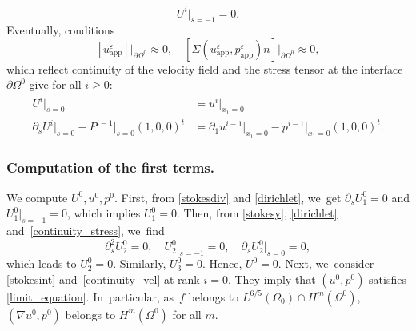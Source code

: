 \documentclass[10pt,a4paper]{amsart}
\newcommand{\app}{\mathrm{app}}
\theoremstyle{plain}
\theoremstyle{definition}
\let\pa\partial
\let\na\nabla
\let\eps\varepsilon
\begin{document}
\begin{equation} \label{dirichlet}
U^i\vert_{s = -1} = 0.
\end{equation}
Eventually, conditions
\[
[u^\eps_{\app}]\vert_{\pa \Omega^0} \approx 0, \quad [\Sigma(u^\eps_{\app},p^\eps_{\app})n]\vert_{\pa \Omega^0} \approx 0,
\]
which reflect continuity of the velocity field and the stress tensor at the interface $\pa \Omega^0$ give for all $i \ge 0$:
\begin{align}
U^i\vert_{s=0} & = u^i\vert_{x_1=0} \label{continuity_vel} \\
\pa_s U^i \vert_{s=0} - P^{i-1}\vert_{s=0} (1,0,0)^t & = \pa_1 u^{i-1}\vert_{x_1=0} - p^{i-1}\vert_{x_1=0} (1,0,0)^t. \label{continuity_stress}
\end{align}

\subsubsection*{Computation of the first terms.} We compute $U^0, u^0,p^0$. First, from \eqref{stokesdiv} and \eqref{dirichlet}, we~get $\pa_s U^0_1 = 0$ and $U^0_1\vert_{s=-1} = 0$, which implies $U^0_1 = 0$. Then, from \eqref{stokesy}, \eqref{dirichlet} and~\eqref{continuity_stress}, we~find
\[
\pa^2_s U^0_2 = 0, \quad U^0_2\vert_{s=-1} = 0, \quad \pa_s U^0_2\vert_{s=0} = 0,
\]
which leads to $U^0_2 = 0$. Similarly, $U^0_3 = 0$. Hence, $U^0 = 0$. Next, we~consider \eqref{stokesint} and~\eqref{continuity_vel} at rank $i=0$. They imply that $(u^0,p^0)$ satisfies \eqref{limit_equation}. In~particular, as~$f$ belongs to $L^{6/5}(\Omega_0) \cap H^m(\Omega^0)$, $(\na u^0,p^0)$ belongs to $H^m(\Omega^0)$ for all $m$.
\end{document}
